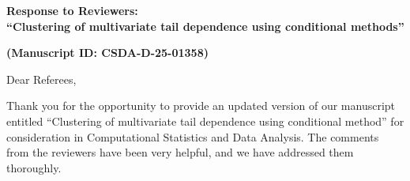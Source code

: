 \documentclass[a4paper,12pt]{article}
\begin{document}
\noindent \textbf{{\Large Response to Reviewers:\\
``Clustering of multivariate tail dependence using conditional methods''}}

\vspace*{.25cm}

\noindent \textbf{{\large(Manuscript ID: CSDA-D-25-01358)}}

\vspace*{.25cm}


\vspace{.5cm}


Dear Referees,

Thank you for the opportunity to provide an updated version of our manuscript entitled ``Clustering of multivariate tail dependence using conditional method'' for consideration in Computational Statistics and Data Analysis. The comments from the reviewers have been very helpful, and we have addressed them thoroughly.\\
\end{document}

